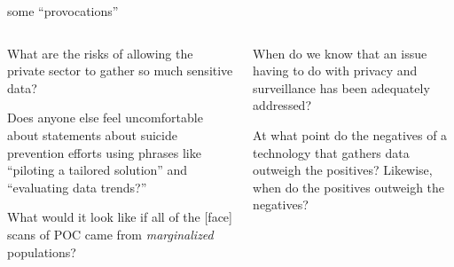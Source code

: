 \documentclass[aspectratio=43,17pt]{beamer} %
\begin{document}
\begin{frame}{some ``provocations''}
\vspace{2em}
{\footnotesize
\begin{columns}
\begin{column}{0.5\textwidth}
{What are the risks of allowing the private sector to gather so much sensitive data?}

\vspace{1em}

{Does anyone else feel uncomfortable about statements about suicide prevention efforts using phrases like ``piloting a tailored solution'' and ``evaluating data trends?''}

\vspace{1em}

{What would it look like if all of the [face] scans of POC came from \emph{marginalized} populations?}
\end{column}
\begin{column}{0.5\textwidth}
{When do we know that an issue having to do with privacy and surveillance has been adequately addressed?}

\vspace{1em}

{At what point do the negatives of a technology that gathers data outweigh the positives? Likewise, when do the positives outweigh the negatives?}


\end{column}
\end{columns}}

\end{frame}


%
\end{document}
